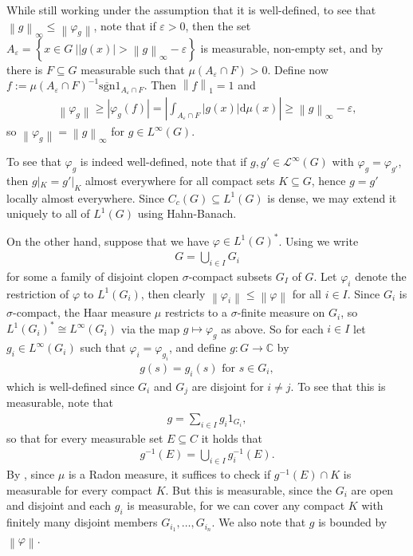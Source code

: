 \documentclass[10pt,twoside,openany,final]{memoir}
\theoremstyle{definition}
\theoremstyle{Break}
\newcommand{\lv}{\left\lVert}
\newcommand{\rv}{\right\rVert}
\newcommand{\C}{\mathbb{C}}
\renewcommand{\d}{\mathrm{d}}
\begin{document}
While still working under the assumption that it is well-defined, to see that $\lv g \rv_{\infty} \leq \lv \varphi_g \rv$, note that if $\varepsilon>0$, then the set $A_\varepsilon=\left\{ x \in G \ \big|  |g(x)|> \lv g \rv_{\infty}-\varepsilon \right\}$ is measurable, non-empty set, and by  there is $F \subseteq G$ measurable such that $\mu(A_\varepsilon \cap F)>0$. Define now $f:=\mu(A_\varepsilon \cap F)^{-1} \overline{\mathrm{sgn}} 1_{A_\varepsilon \cap F}$. Then $\lv f \rv_1 =1$ and
\begin{align*}
	\lv \varphi_g \rv \geq |\varphi_g(f)| = \left|\int_{A_\varepsilon \cap F}|g(x)| \d \mu(x) \right| \geq \lv g \rv_\infty - \varepsilon,
\end{align*}
so $\lv \varphi_g\rv=\lv g \rv_{\infty}$ for $g \in L^\infty(G)$.

To see that $\varphi_g$ is indeed well-defined, note that if $g,g' \in \mathcal{L}^\infty(G)$ with $\varphi_g=\varphi_{g'}$, then $g|_K=g'|_K$ almost everywhere for all compact sets $K \subseteq G$, hence $g=g'$ locally almost everywhere. Since $C_c(G) \subseteq L^1(G)$ is dense, we may extend it uniquely to all of $L^1(G)$ using Hahn-Banach.

On the other hand, suppose that we have $\varphi \in L^1(G)^*$. Using  we write 
\begin{align*}
	G=\bigcup_{i \in I} G_i
\end{align*}
for some a family of disjoint clopen $\sigma$-compact subsets $G_I$ of $G$. Let $\varphi_i$ denote the restriction of $\varphi$ to $L^1(G_i)$, then clearly $\lv \varphi_i \rv \leq \lv \varphi \rv$ for all $i \in I$. Since $G_i$ is $\sigma$-compact, the Haar measure $\mu$ restricts to a $\sigma$-finite measure on $G_i$, so  $L^1(G_i)^* \cong L^\infty(G_i)$ via the map $g \mapsto \varphi_g$ as above. So for each $i \in I$ let $g_i \in L^\infty(G_i)$ such that $\varphi_i=\varphi_{g_i}$, and define $g \colon G \to \C$ by
\begin{align*}
	g(s) = g_i(s) \text{ for } s \in G_i,
\end{align*}
which is well-defined since $G_i$ and $G_j$ are disjoint for $i \neq j$. To see that this is measurable, note that 
\begin{align*}
	g=\sum_{i \in I} g_i1_{G_i},
\end{align*}
so that for every measurable set $E \subseteq C$ it holds that
\begin{align*}
	g^{-1}(E)=\bigcup_{i \in I}g_i^{-1}(E).
\end{align*}
By \cite[126]{hewitt2012abstract}, since $\mu$ is a Radon measure, it suffices to check if $g^{-1}(E)\cap K$ is measurable for every compact $K$. But this is measurable, since the $G_i$ are open and disjoint and each $g_i$ is measurable, for we can cover any compact $K$ with finitely many disjoint members $G_{i_1},\dots,G_{i_n}$. We also note that $g$ is bounded by $\lv \varphi \rv$.
\end{document}
